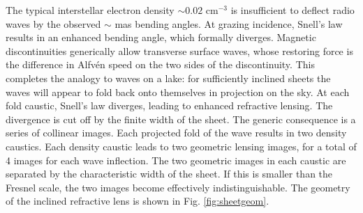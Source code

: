 \documentclass[useAMS,usenatbib]{mn2e}
\begin{document}
The typical interstellar electron density $\sim 0.02$ cm$^{-3}$ 
is insufficient to deflect
radio waves by the observed $\sim$ mas bending angles.  At grazing
incidence, Snell's law results in an enhanced bending angle, which
formally diverges.  Magnetic discontinuities generically allow transverse surface waves, whose restoring force is the difference in Alfv\'en
speed on the two sides of the discontinuity.  This completes the
analogy to waves on a lake: for sufficiently inclined sheets the waves
will appear to fold back onto themselves in projection on the sky.  At
each fold caustic, Snell's law diverges, leading to enhanced
refractive lensing.  The divergence is cut off by the finite width of
the sheet.  The generic consequence is a series of collinear images.
Each projected fold of the wave results in two density caustics.  Each density
caustic leads to two geometric lensing images, for a total of 4 images
for each wave inflection.  The two geometric images in each caustic are
separated by the characteristic width of the sheet. If this is smaller
than the Fresnel scale, the two images become effectively
indistinguishable. 
The geometry of the inclined refractive lens is shown in Fig. \ref{fig:sheetgeom}.  
\end{document}

